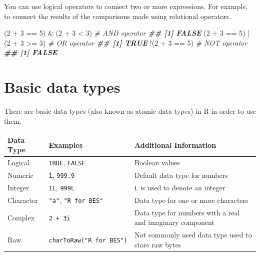 \documentclass[
]{book}
\newenvironment{Shaded}{\begin{snugshade}}{\end{snugshade}}
\newcommand{\CommentTok}[1]{\textcolor[rgb]{0.56,0.35,0.01}{\textit{#1}}}
\newcommand{\DecValTok}[1]{\textcolor[rgb]{0.00,0.00,0.81}{#1}}
\newcommand{\DocumentationTok}[1]{\textcolor[rgb]{0.56,0.35,0.01}{\textbf{\textit{#1}}}}
\newcommand{\NormalTok}[1]{#1}
\newcommand{\SpecialCharTok}[1]{\textcolor[rgb]{0.00,0.00,0.00}{#1}}
\begin{document}
You can use logical operators to connect two or more expressions. For example, to connect the results of the comparisons made using relational operators.

\begin{Shaded}
\begin{Highlighting}[]
\NormalTok{(}\DecValTok{2} \SpecialCharTok{+} \DecValTok{3} \SpecialCharTok{==} \DecValTok{5}\NormalTok{) }\SpecialCharTok{\&}\NormalTok{ (}\DecValTok{2} \SpecialCharTok{+} \DecValTok{3} \SpecialCharTok{\textless{}} \DecValTok{3}\NormalTok{) }\CommentTok{\# AND operator}
\DocumentationTok{\#\# [1] FALSE}
\NormalTok{(}\DecValTok{2} \SpecialCharTok{+} \DecValTok{3} \SpecialCharTok{==} \DecValTok{5}\NormalTok{) }\SpecialCharTok{|}\NormalTok{ (}\DecValTok{2} \SpecialCharTok{+} \DecValTok{3} \SpecialCharTok{\textgreater{}=} \DecValTok{3}\NormalTok{) }\CommentTok{\# OR operator}
\DocumentationTok{\#\# [1] TRUE}
\SpecialCharTok{!}\NormalTok{(}\DecValTok{2} \SpecialCharTok{+} \DecValTok{3} \SpecialCharTok{==} \DecValTok{5}\NormalTok{) }\CommentTok{\# NOT operator}
\DocumentationTok{\#\# [1] FALSE}
\end{Highlighting}
\end{Shaded}

\hypertarget{basic-data-types}{%
\section{Basic data types}\label{basic-data-types}}

There are basic data types (also known as atomic data types) in R in order to use them.

\begin{longtable}[]{@{}lll@{}}
\toprule
Data Type & Examples & Additional Information \\
\midrule
\endhead
Logical & \texttt{TRUE}, \texttt{FALSE} & Boolean values \\
Numeric & \texttt{1}, \texttt{999.9} & Default data type for numbers \\
Integer & \texttt{1L}, \texttt{999L} & \texttt{L} is used to denote an integer \\
Character & \texttt{"a"}, \texttt{"R\ for\ BES"} & Data type for one or more characters \\
Complex & \texttt{2\ +\ 3i} & Data type for numbers with a real and imaginary component \\
Raw & \texttt{charToRaw("R\ for\ BES")} & Not commonly used data type used to store raw bytes \\
\bottomrule
\end{longtable}
\end{document}
